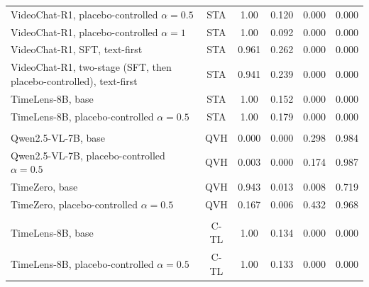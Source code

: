 \begin{table}[!htbp]
\begin{tabular}{@{}>{\raggedright\arraybackslash}p{5.8cm}ccccc@{}}
VideoChat-R1, placebo-controlled $\alpha{=}0.5$ & STA & 1.00 & 0.120 & 0.000 & 0.000 \\
VideoChat-R1, placebo-controlled $\alpha{=}1$ & STA & 1.00 & 0.092 & 0.000 & 0.000 \\
VideoChat-R1, SFT, text-first & STA & 0.961 & 0.262 & 0.000 & 0.000 \\
VideoChat-R1, two-stage (SFT, then placebo-controlled), text-first & STA & 0.941 & 0.239 & 0.000 & 0.000 \\
TimeLens-8B, base & STA & 1.00 & 0.152 & 0.000 & 0.000 \\
TimeLens-8B, placebo-controlled $\alpha{=}0.5$ & STA & 1.00 & 0.179 & 0.000 & 0.000 \\
\addlinespace[1pt]\multicolumn{6}{@{}l}{\textit{QVHighlights}} \\
Qwen2.5-VL-7B, base & QVH & 0.000 & 0.000 & 0.298 & 0.984 \\
Qwen2.5-VL-7B, placebo-controlled $\alpha{=}0.5$ & QVH & 0.003 & 0.000 & 0.174 & 0.987 \\
TimeZero, base & QVH & 0.943 & 0.013 & 0.008 & 0.719 \\
TimeZero, placebo-controlled $\alpha{=}0.5$ & QVH & 0.167 & 0.006 & 0.432 & 0.968 \\
\addlinespace[1pt]\multicolumn{6}{@{}l}{\textit{Charades, TimeLens re-annotation}} \\
TimeLens-8B, base & C-TL & 1.00 & 0.134 & 0.000 & 0.000 \\
TimeLens-8B, placebo-controlled $\alpha{=}0.5$ & C-TL & 1.00 & 0.133 & 0.000 & 0.000 \\
\bottomrule
\end{tabular}
\end{table}
